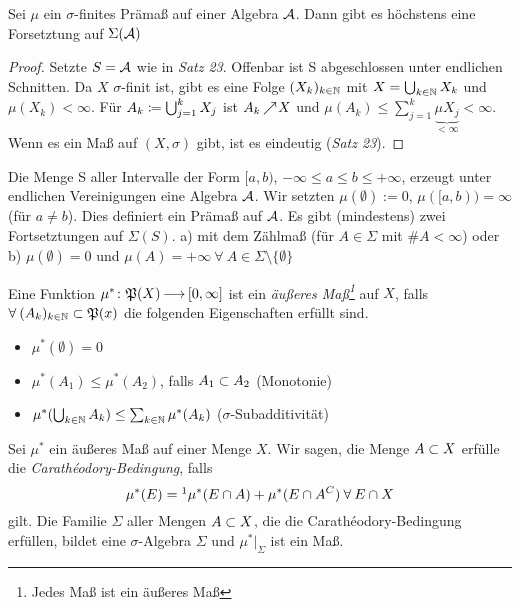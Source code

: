 \documentclass[skript.tex]{subfiles}
\begin{document}
	\begin{cor}
		Sei $\mu$ ein $\sigma$-finites Prämaß auf einer Algebra $\mathcal{A}$. Dann gibt es höchstens eine Forsetztung auf $\Sigma(\mathcal{A})$
	\end{cor}
	\begin{proof}
		Setzte $S=\mathcal{A}$ wie in \textit{Satz 23}. Offenbar ist S abgeschlossen unter endlichen Schnitten. Da $X$ $\sigma$-finit ist, gibt es eine Folge $(X_k)_{k\in\mathbb{N}}$ mit $X=\bigcup_{k\in\mathbb{N}}X_k$ und $\mu(X_k)<\infty$. Für $A_k\coloneqq\bigcup_{j=1}^{k}X_j$ ist $A_k \kern -1pt \nearrow \kern -2pt X$ und $\mu(A_k) \leq \sum_{j=1}^{k}\underbrace{\mu{X_j}}_{<\infty}<\infty$. Wenn es ein Maß auf $(X,\sigma)$ gibt, ist es eindeutig (\textit{Satz 23}).
	\end{proof}

	\begin{bsp}
		Die Menge S aller Intervalle der Form $[a,b)$, $-\infty\leq a \leq b \leq +\infty$, erzeugt unter endlichen Vereinigungen eine Algebra $\mathcal{A}$. Wir setzten $\mu(\emptyset):=0$, $\mu([a,b))=\infty$ (für $a\neq b$). Dies definiert ein Prämaß auf $\mathcal{A}$. Es gibt (mindestens) zwei Fortsetztungen auf $\Sigma(S)$. a) mit dem Zählmaß (für $A\in\Sigma$ mit $\#A<\infty$) oder b) $\mu(\emptyset)=0$ und $\mu(A)=+\infty \: \forall \: A\in\Sigma \setminus \{\emptyset\}$
	\end{bsp}

	\begin{defin}
		Eine Funktion $\mu^*\colon\mathfrak{P}(X)\kern -1pt \longrightarrow \kern -1pt[0,\infty]$ ist ein \textit{äußeres Maß\footnote{Jedes Maß ist ein äußeres Maß}} auf $X$, falls $\forall \: (A_k)_{k\in\mathbb{N}} \subset \mathfrak{P}(x)$ die folgenden Eigenschaften erfüllt sind.
		\begin{itemize}
			\item $\mu^*(\emptyset)=0$
			\item $\mu^*(A_1)\leq \mu^*(A_2)$, falls $A_1 \subset A_2$ (Monotonie)
			\item $\mu^*(\bigcup_{k\in\mathbb{N}}A_k)\leq \sum_{k\in\mathbb{N}}\mu^*(A_k)$ ($\sigma$-Subadditivität)
		\end{itemize}
	\end{defin}

	\begin{theorem}
		Sei $\mu^*$ ein äußeres Maß auf einer Menge $X$. Wir sagen, die Menge $A \subset X$ erfülle die \textit{Carathéodory-Bedingung}, falls
			\begin{equation*}
				\mu^*(E)=\footnotemark \mu^*(E \cap A) + \mu^*(E \cap A^C) \: \forall \: E \cap X
			\end{equation*}
		gilt. Die Familie $\Sigma$ aller Mengen $A \subset X$, die die Carathéodory-Bedingung erfüllen, bildet eine $\sigma$-Algebra $\Sigma$ und $\mu^*|_\Sigma$ ist ein Maß.
	\end{theorem}
\end{document}
